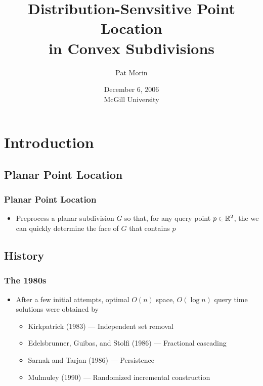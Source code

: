 \documentclass{beamer}
\title{Distribution-Senvsitive Point Location\\ in Convex Subdivisions}
\author{Pat Morin}
\institute{Carleton University}
\date{December 6, 2006 \\ McGill University}
\begin{document}
\frame{\titlepage}

\section[Outline]{}
\frame{\tableofcontents}

\section{Introduction}
\subsection{Planar Point Location}
\frame
{
  \frametitle{Planar Point Location}
  \begin{itemize}
  \item Preprocess a planar subdivision $G$ so that, for any query
point $p\in\mathbb{R}^2$, the we can quickly determine the face of $G$
that contains $p$
  \begin{center}
  \end{center}
  \end{itemize}
}

\subsection{History}

\frame
{
  \frametitle{The 1980s}
  \begin{itemize}
  \item<1-> After a few initial attempts, optimal $O(n)$ space, $O(\log
n)$ query time solutions were obtained by
  \begin{itemize}
   \item<2-> Kirkpatrick (1983) --- Independent set removal
   \item<3-> Edelsbrunner, Guibas, and Stolfi (1986) --- Fractional cascading
   \item<4-> Sarnak and Tarjan (1986) --- Persistence
   \item<5-> Mulmuley (1990) --- Randomized incremental construction
  \end{itemize}
  \end{itemize}
}
\end{document}
